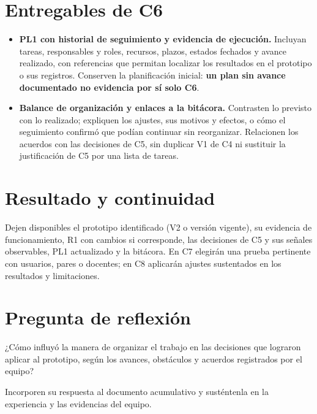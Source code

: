 \section*{Entregables de C6}
\begin{itemize}
\item \textbf{PL1 con historial de seguimiento y evidencia de ejecución.} Incluyan tareas, responsables y roles, recursos, plazos, estados fechados y avance realizado, con referencias que permitan localizar los resultados en el prototipo o sus registros. Conserven la planificación inicial: \textbf{un plan sin avance documentado no evidencia por sí solo C6}.
\item \textbf{Balance de organización y enlaces a la bitácora.} Contrasten lo previsto con lo realizado; expliquen los ajustes, sus motivos y efectos, o cómo el seguimiento confirmó que podían continuar sin reorganizar. Relacionen los acuerdos con las decisiones de C5, sin duplicar V1 de C4 ni sustituir la justificación de C5 por una lista de tareas.
\end{itemize}

\section*{Resultado y continuidad}
Dejen disponibles el prototipo identificado (V2 o versión vigente), su evidencia de funcionamiento, R1 con cambios si corresponde, las decisiones de C5 y sus señales observables, PL1 actualizado y la bitácora. En C7 elegirán una prueba pertinente con usuarios, pares o docentes; en C8 aplicarán ajustes sustentados en los resultados y limitaciones.

\section*{Pregunta de reflexión}
¿Cómo influyó la manera de organizar el trabajo en las decisiones que lograron aplicar al prototipo, según los avances, obstáculos y acuerdos registrados por el equipo?

Incorporen su respuesta al documento acumulativo y susténtenla en la experiencia y las evidencias del equipo.


